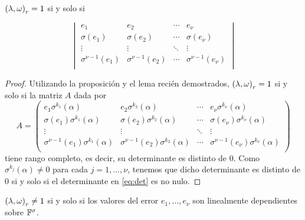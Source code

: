 \begin{proposition}
\label{prop:key_eq_error_iif_det}
\({(\lambda, \omega)}_r = 1\) si y solo si

\begin{equation}
\label{eq:det}
\begin{vmatrix}
e_1 & e_2 & \cdots & e_{\nu} \\
\sigma(e_1) & \sigma(e_2) & \cdots & \sigma(e_{\nu}) \\
\vdots &\vdots &\ddots &\vdots \\
\sigma^{\nu-1}(e_1) & \sigma^{\nu-1}(e_2) & \cdots & \sigma^{\nu-1}(e_{\nu}) \\
\end{vmatrix}
\end{equation}

\end{proposition}
\begin{proof}
Utilizando la proposición y el lema recién demostrados, \({(\lambda, \omega)}_r = 1\) si y solo si la matriz \(A\) dada por
 \[
A = \begin{pmatrix}
e_1\sigma^{k_1}(\alpha) & e_2\sigma^{k_2}(\alpha) & \cdots & e_{\nu}\sigma^{k_\nu}(\alpha) \\
\sigma(e_1)\sigma^{k_1}(\alpha) & \sigma(e_2)\sigma^{k_2}(\alpha) & \cdots & \sigma(e_{\nu})\sigma^{k_\nu}(\alpha) \\
\vdots &\vdots &\ddots &\vdots \\
\sigma^{\nu-1}(e_1)\sigma^{k_1}(\alpha) & \sigma^{\nu-1}(e_2)\sigma^{k_2}(\alpha) & \cdots & \sigma^{\nu-1}(e_{\nu}) \sigma^{k_\nu}(\alpha)\\
\end{pmatrix}
\]
tiene rango completo, es decir, su determinante es distinto de 0. Como \(\sigma^{k_j}(\alpha) \neq 0\) para cada \(j = 1, \ldots, \nu\), tenemos que dicho determinante es distinto de 0 si y solo si el determinante en \ref{eq:det} es no nulo.
\end{proof}

\begin{theorem}
\({(\lambda, \omega)}_r \neq 1\) si y solo si los valores del error \(e_1, \ldots, e_\nu\) son linealmente dependientes sobre \(\mathbb{F}^{\sigma}\).
\end{theorem}

